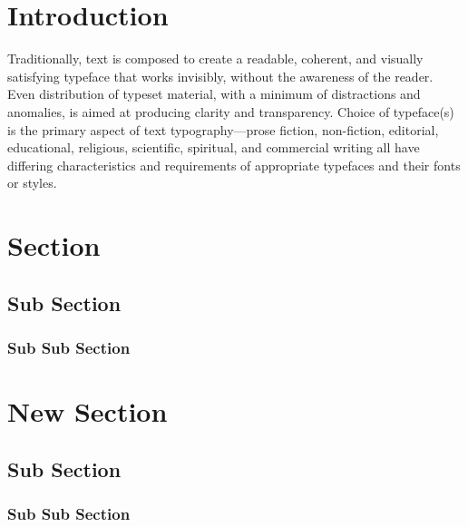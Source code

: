 \documentclass[twoside]{xarticle}
\title{\relax}
\author{\relax}
\date{\relax}
\begin{document}

\thispagestyle{empty}
\maketitle
\tableofcontents

\clearpage

\pagestyle{fancy}

\section{Introduction}
\thispagestyle{empty}

Traditionally, text is composed to create a readable, coherent, and visually
satisfying typeface that works invisibly, without the awareness of the reader.
Even distribution of typeset material, with a minimum of distractions and
anomalies, is aimed at producing clarity and transparency. Choice of typeface(s)
is the primary aspect of text typography—prose fiction, non-fiction, editorial,
educational, religious, scientific, spi\-ritual, and commercial writing all have
differing characteristics and requirements of appropriate typefaces and their
fonts or styles.

\clearpage

\thispagestyle{empty}

\section{Section}
\subsection{Sub Section}
\subsubsection{Sub Sub Section}

\clearpage

\section{New Section}
\subsection{Sub Section}
\subsubsection{Sub Sub Section}
\end{document}
